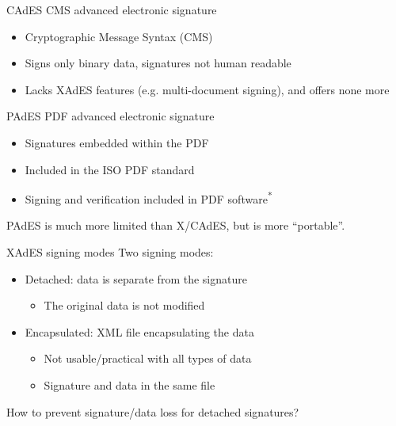 \begin{frame}{CAdES}
  CMS advanced electronic signature
    \begin{itemize}[<+(1)->]
      \item Cryptographic Message Syntax (CMS)
      \item Signs only binary data, signatures not human readable
      \item Lacks XAdES features (e.g. multi-document signing), and offers none more
    \end{itemize}
\end{frame}

\begin{frame}{PAdES}
  PDF advanced electronic signature
  \begin{itemize}[<+(1)->]
    \item Signatures embedded within the PDF
    \item Included in the ISO PDF standard
    \item Signing and verification included in PDF software\textsuperscript{*}
  \end{itemize}

  \vspace*{1em}

  \pause
  PAdES is much more limited than X/CAdES, but is more \enquote{portable}.
\end{frame}

\begin{frame}{XAdES signing modes}
  Two signing modes:
  \begin{itemize}[<+(1)->]
    \item Detached: data is separate from the signature
    \begin{itemize}
      \item The original data is not modified
    \end{itemize}
    \item Encapsulated: XML file encapsulating the data
    \begin{itemize}
      \item Not usable/practical with all types of data
      \item Signature and data in the same file
    \end{itemize}
  \end{itemize}

  \vspace*{1em}

  \pause
  How to prevent signature/data loss for detached signatures?
\end{frame}

